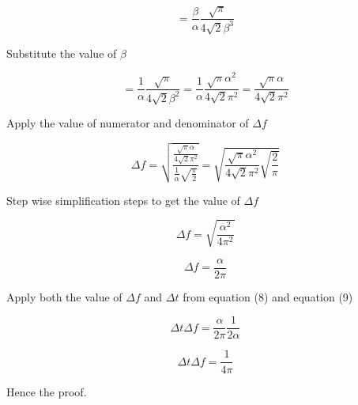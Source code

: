\begin{equation*}
 = \frac{\beta}{\alpha }\frac{\sqrt{\pi}}{4 \sqrt{2}\beta ^3}
\end{equation*}

Substitute the value of $\beta$

\begin{equation*}
 = \frac{1}{\alpha }\frac{\sqrt{\pi}}{4 \sqrt{2}\beta ^2}  = \frac{1}{\alpha }\frac{\sqrt{\pi} \alpha^2}{4 \sqrt{2}\pi ^2} = \frac{\sqrt{\pi} \alpha}{4 \sqrt{2}\pi ^2}
\end{equation*}

Apply the value of numerator and denominator of $\Delta f$

\begin{equation*}
\Delta f = \sqrt{\frac{\frac{\sqrt{\pi} \alpha}{4 \sqrt{2}\pi ^2}}{\frac{1}{\alpha} \sqrt{\frac{\pi}{2 }}}} = \sqrt{\frac{\sqrt{\pi} \alpha^2}{4 \sqrt{2}\pi ^2} \sqrt{\frac{2}{\pi }}}
\end{equation*}

Step wise simplification steps to get the value of $\Delta f$

\begin{equation*}
\Delta f =  \sqrt{\frac{\alpha ^2}{4 \pi ^2}}
\end{equation*}


\begin{equation}
\Delta f =  \frac{\alpha}{2 \pi}
\end{equation}

Apply both the value of $\Delta f$ and $\Delta t$ from equation (8) and equation (9)

\begin{equation*}
\Delta t \Delta f =  \frac{\alpha}{2 \pi} \frac{1}{2 \alpha }
\end{equation*}

\begin{equation*}
\boxed{\Delta t \Delta f =  \frac{1}{4 \pi}}
\end{equation*}

Hence the proof.
